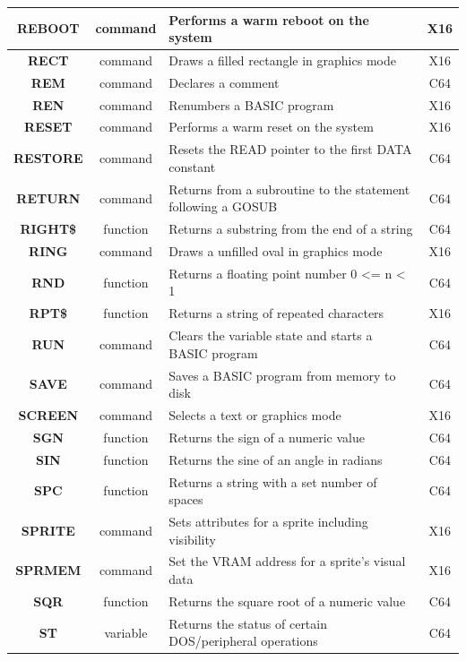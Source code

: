 \begin{longtable}{|c|c|m{4cm}|c|}
	{\bfseries REBOOT} & command & Performs a warm reboot on the system & X16 \\ \hline
	{\bfseries RECT} & command & Draws a filled rectangle in graphics mode & X16 \\ \hline
	{\bfseries REM} & command & Declares a comment & C64 \\ \hline
	{\bfseries REN} & command & Renumbers a BASIC program & X16 \\ \hline
	{\bfseries RESET} & command & Performs a warm reset on the system & X16 \\ \hline
	{\bfseries RESTORE} & command & Resets the {\ttfamily READ} pointer to the first {\ttfamily DATA} constant & C64 \\ \hline
	{\bfseries RETURN} & command & Returns from a subroutine to the statement following a GOSUB & C64 \\ \hline
	{\bfseries RIGHT\$} & function & Returns a substring from the end of a string & C64 \\ \hline
	{\bfseries RING} & command & Draws a unfilled oval in graphics mode & X16 \\ \hline
	{\bfseries RND} & function & Returns a floating point number 0 <= n < 1 & C64 \\ \hline
	{\bfseries RPT\$} & function & Returns a string of repeated characters & X16 \\ \hline
	{\bfseries RUN} & command & Clears the variable state and starts a BASIC program & C64 \\ \hline
	{\bfseries SAVE} & command & Saves a BASIC program from memory to disk & C64 \\ \hline
	{\bfseries SCREEN} & command & Selects a text or graphics mode & X16 \\ \hline
	{\bfseries SGN} & function & Returns the sign of a numeric value & C64 \\ \hline
	{\bfseries SIN} & function & Returns the sine of an angle in radians & C64 \\ \hline
	{\bfseries SPC} & function & Returns a string with a set number of spaces & C64 \\ \hline
	{\bfseries SPRITE} & command & Sets attributes for a sprite including visibility & X16 \\ \hline
	{\bfseries SPRMEM} & command & Set the VRAM address for a sprite's visual data & X16 \\ \hline
	{\bfseries SQR} & function & Returns the square root of a numeric value & C64 \\ \hline
	{\bfseries ST} & variable & Returns the status of certain DOS/peripheral operations & C64 \\ \hline

\end{longtable}
